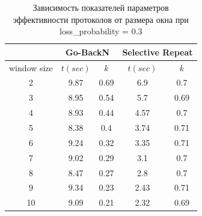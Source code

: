 \begin{table}[H]
	\begin{center}
		\begin{tabular}{|c|c|c|c|c|}
			\hline
			& \multicolumn{2}{c|}{Go-BackN} & \multicolumn{2}{c|}{Selective Repeat} \\
			\hline
			window size & $t (sec)$ & $k$ & $t (sec)$ & $k$ \\
			\hline
			2 & 9.87 & 0.69 & 6.9 & 0.7 \\
			\hline
			3 & 8.95 & 0.54 & 5.7 & 0.69\\
			\hline
			4 & 8.93 & 0.44 & 4.57 & 0.7\\
			\hline
			5 & 8.38 & 0.4 & 3.74 & 0.71\\
			\hline
			6 & 9.24 & 0.32 & 3.35 & 0.71\\
			\hline
			7 & 9.02 & 0.29 & 3.1 & 0.7\\
			\hline
			8 & 8.47 & 0.27 & 2.8 & 0.7\\
			\hline
			9 & 9.34 & 0.23 & 2.43 & 0.71\\
			\hline
			10 & 9.09 & 0.21 & 2.32 & 0.69\\
			\hline
		\end{tabular}
		\caption{Зависимость показателей параметров эффективности протоколов от размера окна при loss\_probability = 0.3}
	\end{center}
\end{table}
